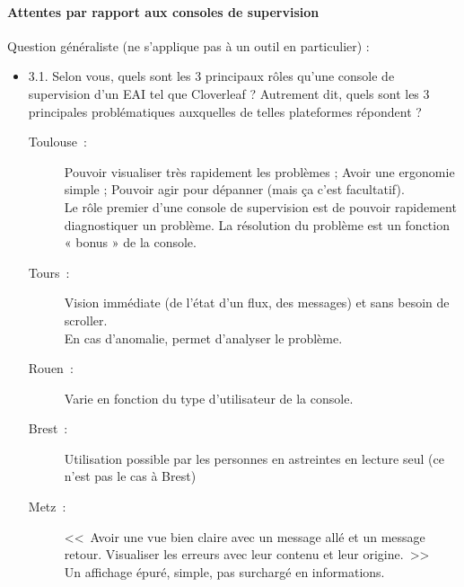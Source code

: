 	\paragraph{Attentes par rapport aux consoles de supervision}
	Question généraliste (ne s’applique pas à un outil en particulier) :
	\begin{itemize}
	  \item 3.1. Selon vous, quels sont les 3 principaux rôles qu’une console de
	  supervision d’un EAI tel que Cloverleaf ? Autrement dit, quels sont les 3
	  principales problématiques auxquelles de telles plateformes répondent ?
	  \begin{description}
	  	\item[Toulouse~:] Pouvoir visualiser très rapidement les problèmes ; Avoir
	  	une ergonomie simple ; Pouvoir agir pour dépanner (mais ça c’est
	  	facultatif).\\
	  	Le rôle premier d’une console de supervision est de pouvoir
	  	rapidement diagnostiquer un problème. La résolution du problème est un
	  	fonction « bonus » de la console.
	  	\item[Tours~:] Vision immédiate (de l’état d’un flux, des messages) et sans
	  	besoin de scroller.\\
		En cas d’anomalie, permet d’analyser le problème.
	  	\item[Rouen~:] Varie en fonction du type d’utilisateur de la console.
	  	\item[Brest~:] Utilisation possible par les personnes en astreintes en
	  	lecture seul (ce n’est pas le cas à Brest)
	  	\item[Metz~:] <<~Avoir une vue bien claire avec un message allé et un
	  	message retour. Visualiser les erreurs avec leur contenu et leur
	  	origine.~>>\\
	  	Un affichage épuré, simple, pas surchargé en informations.
	  \end{description}
	\end{itemize}
	
